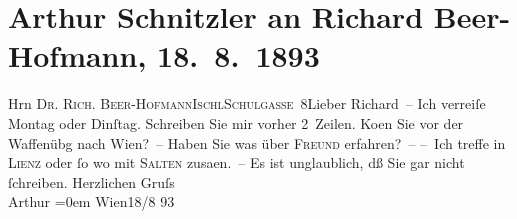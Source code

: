 

         
         \renewcommand{\erwaehntePersonen}{Personen: Richard Beer-Hofmann, Carl Freund, Felix Salten}
         \renewcommand{\erwaehnteOrte}{Orte: Bad Ischl, Lienz, Schulgasse, Wien}
         \renewcommand{\erwaehnteWerke}{}
               \section[Arthur Schnitzler an Richard Beer-Hofmann, 18. 8. 1893]{ Arthur Schnitzler an Richard Beer-Hofmann, 18. 8. 1893}\nopagebreak{}\rehead{ }\begin{ledgroupsized}[t]{13cm}\normalsize\beginnumbering \toendnotes[C]{\smallbreak\pagebreak[2]} 
\pstart{}{\pb}Hrn \textsc{Dr. Rich.
                     Beer-Hofmann}\pend{}\pstart{}\textsc{Ischl}\pend{}\pstart{}\textsc{Schulgasse 8}\pend{}{\bigskip}\pstart{}{\pb}Lieber Richard –\pend\pstart
           Ich verreiſe Montag oder Dinſtag. Schreiben Sie mir vorher
               2 Zeilen. Ko{\geminationm}en Sie vor der Waffenübg nach Wien? –\pend
           \pstart
           Haben Sie was über {\pb}\textsc{Freund} erfahren? –\pend
           \pstart
           – Ich treffe in \textsc{Lienz} oder ſo wo mit \textsc{Salten} zusa{\geminationm}en. –\pend
           \pstart
           Es ist unglaublich, dß Sie gar nicht ſchreiben.\pend
           \pstart
           Herzlichen Gruſs{\\[\baselineskip]}\spacefill\mbox{{\pb}Arthur}\pend
           \leftskip=0em{}\pstart
           Wien18/8 93\pend
           
         
         \endnumbering{}\end{ledgroupsized}  \newcommand{\dateiname}{L00256}\newcommand{\titel}{Arthur Schnitzler an Richard Beer-Hofmann, 18. 8. 1893}\newcommand{\editorInnen}{Martin Anton Müller und Gerd-Hermann Susen}
      